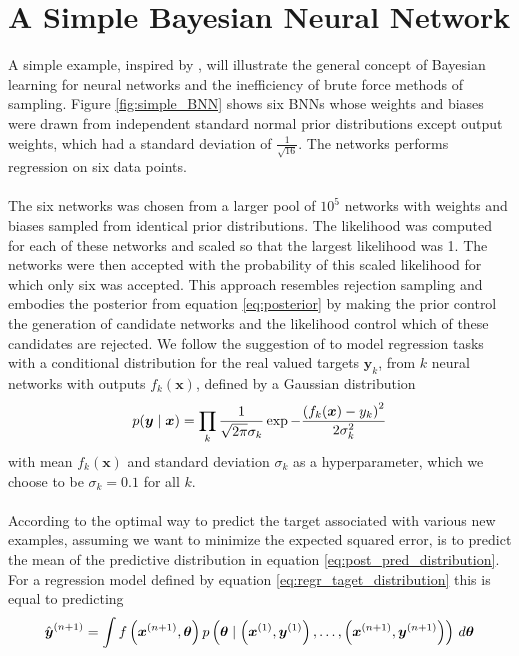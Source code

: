 \section{A Simple Bayesian Neural Network} \label{sec:simple_BNN}
A simple example, inspired by \cite{neal2012bayesian}, will illustrate the general concept of Bayesian learning for neural networks and the inefficiency of brute force methods of sampling. Figure \ref{fig:simple_BNN} shows six BNNs whose weights and biases were drawn from independent standard normal prior distributions except output weights, which had a standard deviation of $\frac{1}{\sqrt{16}}$. The networks performs regression on six data points. 
\\
\\
The six networks was chosen from a larger pool of $10^5$ networks with weights and biases sampled from identical prior distributions. The likelihood was computed for each of these networks and scaled so that the largest likelihood was 1. The networks were then accepted with the probability of this scaled likelihood for which only six was accepted. This approach resembles rejection sampling and embodies the posterior from equation \ref{eq:posterior} by making the prior control the generation of candidate networks and the likelihood control which of these candidates are rejected.
We follow the suggestion of \cite{neal2012bayesian} to model regression tasks with a conditional distribution for the real valued targets $\boldsymbol{y}_k$, from $k$ neural networks with outputs $f_k(\boldsymbol{x})$, defined by a Gaussian distribution
\begin{equation}\label{eq:regr_taget_distribution}
    p(\boldsymbol{y} \mid \boldsymbol{x}) = \prod_k \frac{1}{\sqrt{2 \pi} \sigma_k} \exp{- \frac{\left (f_k(\boldsymbol{x}) - y_k\right)^2}{2 \sigma_k^2}}
\end{equation}
with mean $f_k(\boldsymbol{x})$ and standard deviation $\sigma_k$ as a hyperparameter, which we choose to be $\sigma_k = 0.1$ for all $k$.
\\
\\
According to \cite{neal2012bayesian} the optimal way to predict the target associated with various new examples, assuming we want to minimize the expected squared error, is to predict the mean of the predictive distribution in equation \ref{eq:post_pred_distribution}. For a regression model defined by equation \ref{eq:regr_taget_distribution} this is equal to predicting 
\begin{equation*}
    \hat{\boldsymbol{y}}^{(n+1)} = \int f\left (\boldsymbol{x}^{(n+1)}, \boldsymbol{\theta}\right) p\left (\boldsymbol{\theta} \mid \left (\boldsymbol{x}^{(1)}, \boldsymbol{y}^{(1)}\right), \dots, \left (\boldsymbol{x}^{(n+1)}, \boldsymbol{y}^{(n+1)}\right)\right) \, d \boldsymbol{\theta}
\end{equation*}
